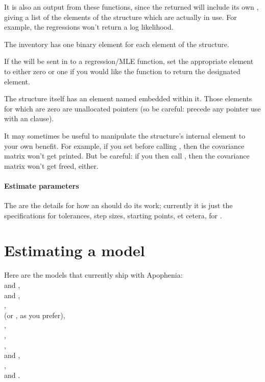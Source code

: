 It is also an output from these functions, since the returned  will include its own ,
giving a list of the elements of the structure which are
actually in use. For example, the regressions won't return a log
likelihood.

The inventory has one binary element for each element of the  structure.

If the  will be sent in to a regression/MLE
function, set the appropriate element to either zero or one if you would
like the function to return the designated  element.

The  structure itself has an 
element named  embedded within it. Those elements for
which  are zero are unallocated pointers (so be careful:
precede any pointer use with an  clause).

It may sometimes be useful to manipulate the  structure's
internal  element to your own benefit. For
example, if you set  before calling
, then the covariance matrix won't get
printed. But be careful: if you then call ,
then the covariance matrix won't get freed, either.

\paragraph{Estimate parameters}
The  are the details for how an  should do its work; currently it is just the specifications
for tolerances, step sizes, starting points, et cetera, for .

\section{Estimating a model}
Here are the models that currently ship with Apophenia:\\
 and , \\
 and , \\
, \\
 (or , as you prefer), \\
, \\
, \\
, \\
 and , \\
, \\
 and .

